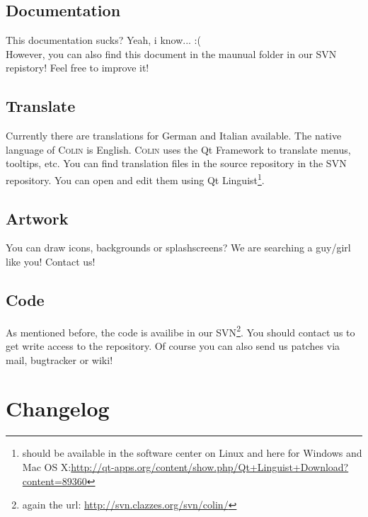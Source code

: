 \documentclass[a4paper,11pt]{report}
\newcommand{\Colin}[0]{\textsc{Colin }}
\begin{document}
\section{Documentation}
This documentation sucks? Yeah, i know... :(\\
However, you can also find this document in the maunual folder in our SVN repistory! Feel free to improve it!

\section{Translate}
Currently there are translations for German and Italian available. The native language of \Colin is English.
\Colin uses the Qt Framework to translate menus, tooltips, etc. You can find translation files in the source repository in the SVN repository. You can open and edit them using Qt Linguist\footnote{should be available in the software center on Linux and here for Windows and Mac OS X:\url{http://qt-apps.org/content/show.php/Qt+Linguist+Download?content=89360}}.

\section{Artwork}
You can draw icons, backgrounds or splashscreens? We are searching a guy/girl like you! Contact us!

\section{Code}
As mentioned before, the code is availibe in our SVN\footnote{again the url: \url{http://svn.clazzes.org/svn/colin/}}. You should contact us to get write access to the repository. Of course you can also send us patches via mail, bugtracker or wiki!

\chapter{Changelog}




%
\end{document}
